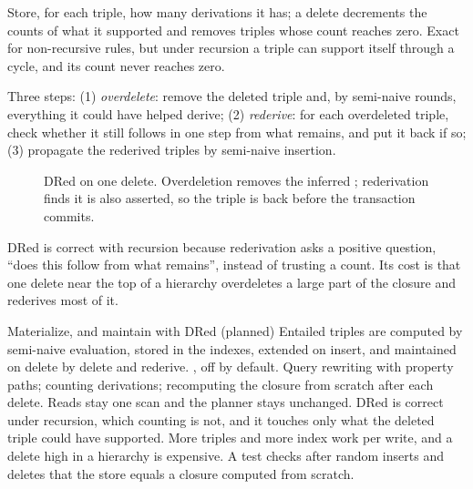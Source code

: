 \begin{description}[leftmargin=1.2em]
\item[Counting.] Store, for each triple, how many derivations it has; a delete
decrements the counts of what it supported and removes triples whose count
reaches zero. Exact for non-recursive rules, but under recursion a triple can
support itself through a cycle, and its count never reaches zero.
\item[Delete and rederive (DRed).] Three steps: (1) \emph{overdelete}:
remove the deleted triple and, by semi-naive rounds, everything it could have
helped derive; (2) \emph{rederive}: for each overdeleted triple, check whether
it still follows in one step from what remains, and put it back if so; (3)
propagate the rederived triples by semi-naive insertion.
\end{description}

\begin{figure}[ht]
\centering
{}
\caption{DRed on one delete. Overdeletion removes the inferred ; rederivation finds it is also asserted, so the triple
is back before the transaction commits.}
\end{figure}

DRed is correct with recursion because rederivation asks a positive question,
``does this follow from what remains'', instead of trusting a count. Its cost is
that one delete near the top of a hierarchy overdeletes a large part of the
closure and rederives most of it.

\begin{decision}{Materialize, and maintain with DRed (planned)}
 Entailed triples are computed by semi-naive evaluation, stored
in the indexes, extended on insert, and maintained on delete by delete and
rederive. , off by default.
 Query rewriting with property paths; counting
derivations; recomputing the closure from scratch after each delete.
 Reads stay one scan and the planner stays unchanged. DRed is
correct under recursion, which counting is not, and it touches only what the
deleted triple could have supported.
 More triples and more index work per write, and a delete high in
a hierarchy is expensive. A test checks after random inserts and deletes that
the store equals a closure computed from scratch.
\end{decision}

